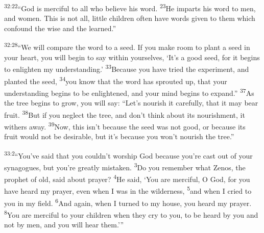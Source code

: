 \documentclass[openany,12pt,english]{book}
\newenvironment{para}{\par\pretolerance=100\tolerance=200\setlength{\emergencystretch}{0.6em}\relax}{\par}
\begin{document}
\begin{para}
    \textsuperscript{32:22}\thinspace{}“God is mer\-ci\-ful to all who be\-lieve his word.
    \textsuperscript{23}\thinspace{}He imparts his word to men, and wom\-en. This is not all, lit\-tle chil\-dren of\-ten have words giv\-en to them which con\-found the wise and the learn\-ed.”
\end{para}

\begin{para}
    \textsuperscript{32:28}\thinspace{}“We will com\-pare the word to a seed. If you make room to plant a seed in your heart, you will be\-gin to say with\-in your\-selves, ‘It's a good seed, for it begins to en\-light\-en my un\-der\-stand\-ing.’
    \textsuperscript{33}\thinspace{}Be\-cause you have tried the ex\-per\-i\-ment, and planted the seed,
    \textsuperscript{34}\thinspace{}you know that the word has sprouted up, that your un\-der\-stand\-ing begins to be enlightened, and your mind begins to ex\-pand.”
    \textsuperscript{37}\thinspace{}As the tree begins to grow, you will say: “Let's nour\-ish it care\-ful\-ly, that it may bear fruit.
    \textsuperscript{38}\thinspace{}But if you ne\-glect the tree, and don't think a\-bout its nour\-ish\-ment, it with\-ers a\-way.
    \textsuperscript{39}\thinspace{}Now, this is\-n't be\-cause the seed was not good, or be\-cause its fruit would not be de\-sir\-a\-ble, but it's be\-cause you won't nour\-ish the tree.”
\end{para}

\begin{para}
    \textsuperscript{33:2}\thinspace{}“You've said that you could\-n't wor\-ship God be\-cause you're cast out of your synagogues, but you're great\-ly mis\-tak\-en.
    \textsuperscript{3}\thinspace{}Do you re\-mem\-ber what Zenos, the proph\-et of old, said a\-bout pray\-er?
    \textsuperscript{4}\thinspace{}He said, ‘You are mer\-ci\-ful, O God, for you have heard my pray\-er, e\-ven when I was in the wil\-der\-ness,
    \textsuperscript{5}\thinspace{}and when I cried to you in my field.
    \textsuperscript{6}\thinspace{}And again, when I turned to my house, you heard my pray\-er.
    \textsuperscript{8}\thinspace{}You are mer\-ci\-ful to your chil\-dren when they cry to you, to be heard by you and not by men, and you will hear them.’”
\end{para}
\end{document}

